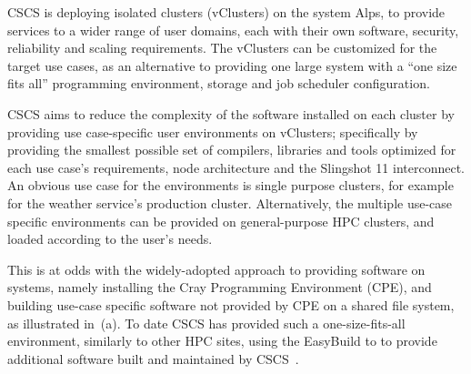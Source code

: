 CSCS is deploying isolated clusters (vClusters) on the \crayex system Alps, to provide services to a wider range of user domains, each with their own software, security, reliability and scaling requirements.
The vClusters can be customized for the target use cases, as an alternative to providing one large system with a ``one size fits all'' programming environment, storage and job scheduler configuration.

CSCS aims to reduce the complexity of the software installed on each cluster by providing use case-specific user environments on vClusters; specifically by providing the smallest possible set of compilers, libraries and tools optimized for each use case's requirements, node architecture and the Slingshot 11 interconnect.
An obvious use case for the environments is single purpose clusters, for example for the weather service's production cluster.
Alternatively, the multiple use-case specific environments can be provided on general-purpose HPC clusters, and loaded according to the user's needs.

This is at odds with the widely-adopted approach to providing software on \crayex systems, namely installing the Cray Programming Environment (CPE), and building use-case specific software not provided by CPE on a shared file system, as illustrated in~(a).
To date CSCS has provided such a one-size-fits-all environment, similarly to other HPC sites, using the EasyBuild to to provide additional software built and maintained by CSCS~\cite{forai:cug16}.


